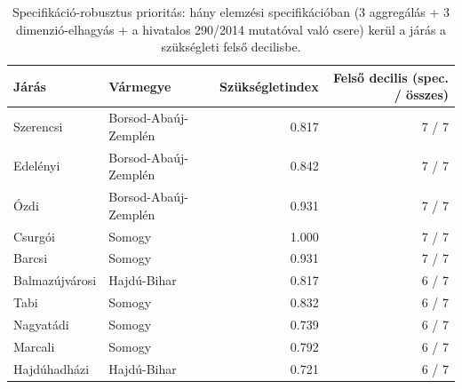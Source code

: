 \begin{table}[htbp]
\centering
\small
\caption{Specifikáció-robusztus prioritás: hány elemzési specifikációban (3 aggregálás + 3 dimenzió-elhagyás + a hivatalos 290/2014 mutatóval való csere) kerül a járás a szükségleti felső decilisbe.}
\label{tab:specrobust}
\begin{tabular}{llrr}
\toprule
Járás & Vármegye & Szükségletindex & Felső decilis (spec. / összes) \\
\midrule
Szerencsi & Borsod-Abaúj-Zemplén & 0.817 & 7 / 7 \\
Edelényi & Borsod-Abaúj-Zemplén & 0.842 & 7 / 7 \\
Ózdi & Borsod-Abaúj-Zemplén & 0.931 & 7 / 7 \\
Csurgói & Somogy & 1.000 & 7 / 7 \\
Barcsi & Somogy & 0.931 & 7 / 7 \\
Balmazújvárosi & Hajdú-Bihar & 0.817 & 6 / 7 \\
Tabi & Somogy & 0.832 & 6 / 7 \\
Nagyatádi & Somogy & 0.739 & 6 / 7 \\
Marcali & Somogy & 0.792 & 6 / 7 \\
Hajdúhadházi & Hajdú-Bihar & 0.721 & 6 / 7 \\
\bottomrule
\end{tabular}
\end{table}
